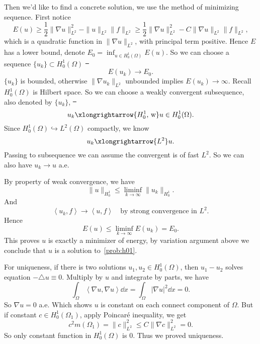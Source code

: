 \documentclass[UTF8,12pt]{article}
\numberwithin{theorem}{section}
\numberwithin{equation}{section}
\begin{document}
Then we'd like to find a concrete solution, we use the method of minimizing
sequence. First notice \[
    E(u)\ge \frac{1}{2}\|\nabla u\|_{L^2}^2-\|u\|_{L^2}\|f\|_{L^2}
    \ge \frac{1}{2}\|\nabla u\|_{L^2}^2-C\|\nabla u\|_{L^2}\|f\|_{L^2},
\] which is a quadratic function in \(\|\nabla u\|_{L^2}\), with principal
term positive. Hence \(E\) has a lower bound, denote \(E_0=\inf_{u\in H_0^1
(\Omega)} E(u)\). So we can choose a sequence \(\{u_k\}\subset H_0^1(\Omega)\)
\st\ \[
    E(u_k)\to E_0.
\] \(\{u_k\}\) is bounded, otherwise \(\|\nabla u_k\|_{L^2}
\) unbounded implies \(E(u_k)\to \infty\). Recall \(H_0^1(\Omega)\) is Hilbert
space. So we can choose a weakly convergent subsequence, also denoted by
\(\{u_k\}\), \st\ \[
    u_k\xlongrightarrow{H_0^1\text{, w}}u\in H_0^1(\Omega)
.\] Since \(H_0^1(\Omega)\hookrightarrow L^2(\Omega)\) compactly, we know \[
    u_k\xlongrightarrow{L^2} u
.\] Passing to subsequence we can assume the convergent is of fast \(L^2\).
So we can also have \(u_k\to u\) a.e.

By property of weak convergence, we have \[
    \|u\|_{H_0^1}\le \liminf_{k\to \infty}\|u_k\|_{H_0^1}
.\] And \[
    \left<u_k,f\right> \to \left<u,f\right> 
    \quad\text{by strong convergence in }L^2
.\] Hence \[
    E(u)\le \liminf_{k\to \infty}E(u_k)=E_0
.\] This proves \(u\) is exactly a minimizer of energy, by variation argument
above we conclude that \(u\) is a solution to~\cref{prob:h01}.

For uniqueness, if there is two solutions \(u_1,u_2\in H_0^1(\Omega)\), then
\(u_1-u_2\) solves equation \(-\triangle u\equiv 0\). Multiply by \(u\) and integrate
by parts, we have \[
    \int_{\Omega}\left<\nabla u,\nabla u\right>\dd{x}
    =\int_{\Omega}|\nabla u|^2\dd{x} =0
.\] So \(\nabla u=0\) a.e. Which shows \(u\) is constant on each connect component
of \(\Omega\). But if constant \(c\in H_0^1(\Omega_1)\), apply Poincaré inequality,
we get \[
    c^2 m(\Omega_1)=\|c\|_{L^2}^2\le C\|\nabla c\|_{L^2}^2=0
.\] So only constant function in \(H_0^1(\Omega)\) is 0. Thus we proved uniqueness.
\end{document}
